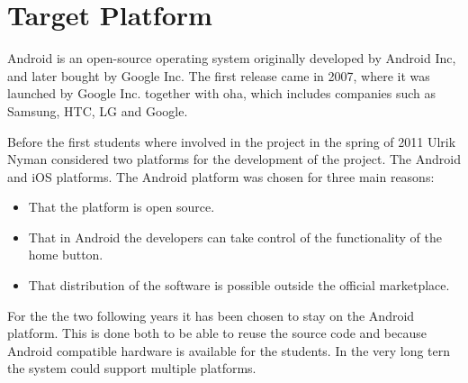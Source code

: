 \section{Target Platform}
\label{sec:platform}
Android is an open-source operating system originally developed by Android Inc, and later bought by Google Inc. The first release came in 2007, where it was launched by Google Inc. together with \ac{oha}, which includes companies such as Samsung, HTC, LG and Google.

Before the first students where involved in the project in the spring of 2011 Ulrik Nyman considered two platforms for the development of the project. The Android and iOS platforms. The Android platform was chosen for three main reasons:
\begin{itemize}
\item That the platform is open source.
\item That in Android the developers can take control of the functionality of the home button.
\item That distribution of the software is possible outside the official marketplace.
\end{itemize}

For the the two following years it has been chosen to stay on the Android platform. This is done both to be able to reuse the source code and because Android compatible hardware is available for the students.
In the very long tern the system could support multiple platforms.



